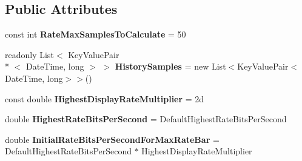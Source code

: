 \subsection*{Public Attributes}
\begin{DoxyCompactItemize}
\item 
\hypertarget{class_cloud_api_public_1_1_event_message_receiver_1_1_status_1_1_c_l_status_file_transfer_a7560b7fb36b8f1bdbbbcc9fda0d61a4c}{const int {\bfseries Rate\-Max\-Samples\-To\-Calculate} = 50}\label{class_cloud_api_public_1_1_event_message_receiver_1_1_status_1_1_c_l_status_file_transfer_a7560b7fb36b8f1bdbbbcc9fda0d61a4c}

\item 
\hypertarget{class_cloud_api_public_1_1_event_message_receiver_1_1_status_1_1_c_l_status_file_transfer_a09e3bf9761ddd3a3ede10b116e9b8f37}{readonly List$<$ Key\-Value\-Pair\\*
$<$ Date\-Time, long $>$ $>$ {\bfseries History\-Samples} = new List$<$Key\-Value\-Pair$<$Date\-Time, long$>$$>$()}\label{class_cloud_api_public_1_1_event_message_receiver_1_1_status_1_1_c_l_status_file_transfer_a09e3bf9761ddd3a3ede10b116e9b8f37}

\item 
\hypertarget{class_cloud_api_public_1_1_event_message_receiver_1_1_status_1_1_c_l_status_file_transfer_a904ff14e9ba7a7c2e12fcf2d3c451192}{const double {\bfseries Highest\-Display\-Rate\-Multiplier} = 2d}\label{class_cloud_api_public_1_1_event_message_receiver_1_1_status_1_1_c_l_status_file_transfer_a904ff14e9ba7a7c2e12fcf2d3c451192}

\item 
\hypertarget{class_cloud_api_public_1_1_event_message_receiver_1_1_status_1_1_c_l_status_file_transfer_a9d9b7d0d51f6820788748f3aafd248a1}{double {\bfseries Highest\-Rate\-Bits\-Per\-Second} = Default\-Highest\-Rate\-Bits\-Per\-Second}\label{class_cloud_api_public_1_1_event_message_receiver_1_1_status_1_1_c_l_status_file_transfer_a9d9b7d0d51f6820788748f3aafd248a1}

\item 
\hypertarget{class_cloud_api_public_1_1_event_message_receiver_1_1_status_1_1_c_l_status_file_transfer_acdece11caebc9dea8e78ae3dcfe2ce28}{double {\bfseries Initial\-Rate\-Bits\-Per\-Second\-For\-Max\-Rate\-Bar} = Default\-Highest\-Rate\-Bits\-Per\-Second $\ast$ Highest\-Display\-Rate\-Multiplier}\label{class_cloud_api_public_1_1_event_message_receiver_1_1_status_1_1_c_l_status_file_transfer_acdece11caebc9dea8e78ae3dcfe2ce28}


\end{DoxyCompactItemize}
